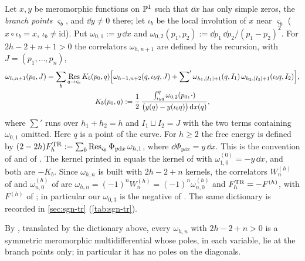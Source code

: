 \begin{conv}
\label{conv:mod-kernel}
Let $x,y$ be meromorphic functions on $\mathbb{P}^1$ such that $\dd x$ has only simple zeros, the \emph{branch points} $\varsigma_b$, and $\dd y\neq 0$ there; let $\iota_b$ be the local involution of $x$ near $\varsigma_b$ ($x\circ\iota_b=x$, $\iota_b\neq\mathrm{id}$). Put $\omega_{0,1}:=y\,\dd x$ and $\omega_{0,2}(p_1,p_2):=\dd p_1\,\dd p_2/(p_1-p_2)^2$. For $2h-2+n+1>0$ the correlators $\omega_{h,n+1}$ are defined by the recursion, with $J=(p_1,\dots,p_n)$,
\begin{equation}
\label{eq:mod-kernel}
\begin{gathered}
\omega_{h,n+1}(p_0,J)=\sum_b\operatorname*{Res}_{q\to\varsigma_b}K_b(p_0,q)\Big[\omega_{h-1,n+2}(q,\iota_bq,J)+{\sum}'\,\omega_{h_1,|I_1|+1}(q,I_1)\,\omega_{h_2,|I_2|+1}(\iota_bq,I_2)\Big],\\
K_b(p_0,q):=\frac{1}{2}\,\frac{\int_{\iota_bq}^{q}\omega_{0,2}(p_0,\cdot)}{\big(y(q)-y(\iota_bq)\big)\,\mathrm{d} x(q)},
\end{gathered}
\end{equation}
where ${\sum}'$ runs over $h_1+h_2=h$ and $I_1\sqcup I_2=J$ with the two terms containing $\omega_{0,1}$ omitted. Here $q$ is a point of the curve. For $h\geq 2$ the free energy is defined by $(2-2h)F^{\mathrm{TR}}_h:=\sum_b\operatorname*{Res}_{\varsigma_b}\Phi_{y\mathrm{d} x}\,\omega_{h,1}$, where $\dd\Phi_{y\dd x}=y\,\dd x$. This is the convention of \cite[(2-26)--(2-29)]{Dunin-Barkowski:2015caa} and of \cite[(2.1)]{Hock25}. The kernel printed in \cite[(4-3), (4-9)]{Eynard:2007kz} equals the kernel of \cite[(1.1)]{ABDKS25} with $\omega^{(0)}_{1,0}=-y\,\dd x$, and both are $-K_b$. Since $\omega_{h,n}$ is built with $2h-2+n$ kernels, the correlators $W^{(h)}_n$ of \cite{Eynard:2007kz} and $\omega^{(h)}_{n,0}$ of \cite{ABDKS25} are
$\omega_{h,n}=(-1)^nW^{(h)}_n=(-1)^n\omega^{(h)}_{n,0}$ and $F^{\mathrm{TR}}_h=-F^{(h)}$, with $F^{(h)}$ of \cite[Def.~4.3 (4-10)]{Eynard:2007kz}; in particular our $\omega_{0,3}$ is the negative of \cite[Thm.~4.1 (4-20)]{Eynard:2007kz}. The same dictionary is recorded in \cref{sec:sgn-tr} (\cref{tab:sgn-tr}).
\end{conv}

By \cite[Thm.~4.2, Thm.~4.6]{Eynard:2007kz}, translated by the dictionary above, every $\omega_{h,n}$ with $2h-2+n>0$ is a symmetric meromorphic multidifferential whose poles, in each variable, lie at the branch points only; in particular it has no poles on the diagonals.

